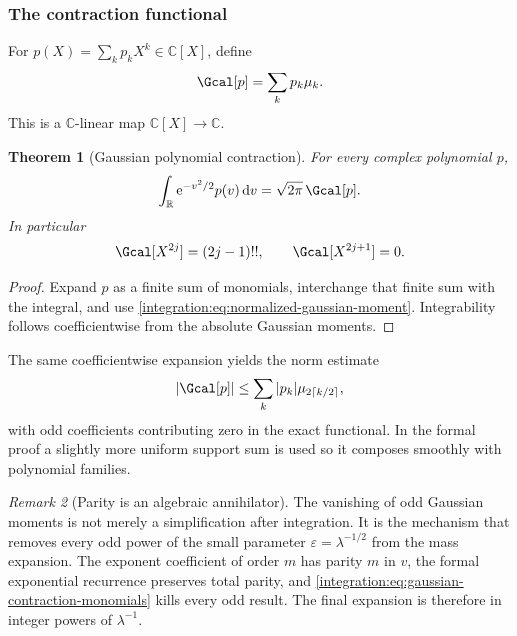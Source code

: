 \documentclass[11pt,oneside]{article}
\newtheorem{theorem}{Theorem}[section]
\theoremstyle{definition}
\theoremstyle{remark}
\newtheorem{remark}[theorem]{Remark}
\newcommand{\R}{\mathbb R}
\newcommand{\C}{\mathbb C}
\newcommand{\e}{\mathrm e}
\newcommand{\dd}{\,\mathrm d}
\begin{document}
\subsubsection{The contraction functional}

For $p(X)=\sum_kp_kX^k\in\C[X]$, define
\begin{equation}
 \Gcal[p]=\sum_kp_k\mu_k.
 \label{integration:eq:gaussian-contraction-def}
\end{equation}
This is a $\C$-linear map $\C[X]\to\C$.

\begin{theorem}[Gaussian polynomial contraction]
\label{integration:thm:gaussian-contraction}
For every complex polynomial $p$,
\begin{equation}
 \int_{\R}\e^{-v^2/2}p(v)\dd v
 =\sqrt{2\pi}\,\Gcal[p].
 \label{integration:eq:gaussian-contraction-integral}
\end{equation}
In particular
\begin{equation}
 \Gcal[X^{2j}]=(2j-1)!!,
 \qquad
 \Gcal[X^{2j+1}]=0.
 \label{integration:eq:gaussian-contraction-monomials}
\end{equation}
\end{theorem}

\begin{proof}
Expand $p$ as a finite sum of monomials, interchange that finite sum with the integral, and
use \eqref{integration:eq:normalized-gaussian-moment}.  Integrability follows coefficientwise from the
absolute Gaussian moments.
\end{proof}

The same coefficientwise expansion yields the norm estimate
\begin{equation}
 \left|\Gcal[p]\right|
 \le\sum_k|p_k|\mu_{2\lceil k/2\rceil},
 \label{integration:eq:gaussian-contraction-norm-bound}
\end{equation}
with odd coefficients contributing zero in the exact functional.  In the formal proof a
slightly more uniform support sum is used so it composes smoothly with polynomial families.

\begin{remark}[Parity is an algebraic annihilator]
The vanishing of odd Gaussian moments is not merely a simplification after integration.  It
is the mechanism that removes every odd power of the small parameter $\varepsilon=
\lambda^{-1/2}$ from the mass expansion.  The exponent coefficient of order $m$ has parity
$m$ in $v$, the formal exponential recurrence preserves total parity, and
\eqref{integration:eq:gaussian-contraction-monomials} kills every odd result.  The final expansion is
therefore in integer powers of $\lambda^{-1}$.
\end{remark}
\end{document}
